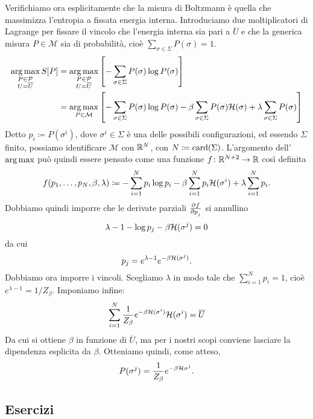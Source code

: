 Verifichiamo ora esplicitamente che la misura di Boltzmann è quella che massimizza l'entropia a fissata energia interna. Introduciamo due moltiplicatori di Lagrange per fissare il vincolo che l'energia interna sia pari a $ \overline{U} $ e che la generica misura $ P\in\mathcal{M} $ sia di probabilità, cioè $ \sum_{\sigma\in\Sigma}P(\sigma) = 1 $.
\begin{align*}
    \operatorname*{arg\, max}_{\substack{P\in\mathcal{P}\\ U=\overline{U}}} S[P] & = \operatorname*{arg\, max}_{\substack{P\in\mathcal{P}\\ U=\overline{U}}} \left[ -\sum_{\sigma\in\Sigma}P(\sigma)\log{P(\sigma)} \right]\\
                                                          & = \operatorname*{arg\, max}_{P\in\mathcal{M}} \left[ -\sum_{\sigma\in\Sigma}P(\sigma)\log{P(\sigma)} - \beta \sum_{\sigma\in\Sigma}P(\sigma)\mathcal{H}(\sigma) + \lambda \sum_{\sigma\in\Sigma}P(\sigma) \right]
\end{align*}
Detto $ p_i \coloneqq P(\sigma^i) $, dove $ \sigma^i \in \Sigma $ è una delle possibili configurazioni, ed essendo $ \Sigma $ finito, possiamo identificare $ \mathcal{M} $ con $ \mathbb{R}^N $, con $ N \coloneqq \operatorname{card}(\Sigma) $. L'argomento dell'$ \operatorname*{arg\, max} $ può quindi essere pensato come una funzione $ f\colon \mathbb{R}^{N+2}\to\mathbb{R} $ così definita
\[ f(p_1, \ldots, p_N, \beta, \lambda) \coloneqq -\sum_{i=1}^N p_i\log{p_i} - \beta \sum_{i=1}^N p_i\mathcal{H}(\sigma^i) + \lambda \sum_{i=1}^N p_i. \]
Dobbiamo quindi imporre che le derivate parziali $ \pd{f}{p_j} $ si annullino
\[ \lambda -1 - \log{p_j} - \beta \mathcal{H}(\sigma^j) = 0 \]
da cui
\[ p_j = e^{\lambda - 1} e^{-\beta\mathcal{H}(\sigma^j)}. \]
Dobbiamo ora imporre i vincoli. Scegliamo $ \lambda $ in modo tale che $ \sum_{i=1}^{N} p_i = 1 $, cioè $ {e^{\lambda - 1} = 1/Z_\beta} $. Imponiamo infine:
\[ \sum_{i=1}^{N} \frac{1}{Z_\beta} e^{-\beta\mathcal{H}(\sigma^i)} \mathcal{H}(\sigma^i) = \overline{U} \]
Da cui si ottiene $ \beta $ in funzione di $ \overline{U} $, ma per i nostri scopi conviene lasciare la dipendenza esplicita da $ \beta $. Otteniamo quindi, come atteso,
\[ P(\sigma^j) = \frac{1}{Z_\beta} e^{-\beta\mathcal{H}{\sigma^j}}. \]

\subsection{Esercizi}

